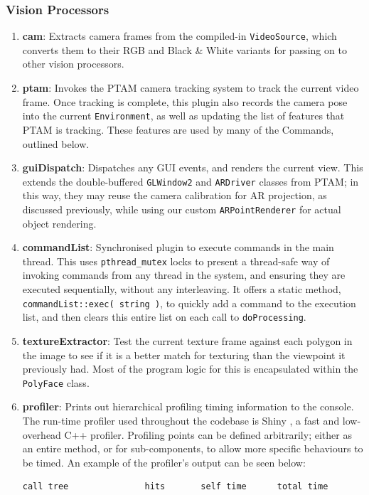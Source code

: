 \documentclass[a4paper,10pt]{article}
\begin{document}
\subsubsection{Vision Processors}
\begin{enumerate}
\item{\textbf{cam}: Extracts camera frames from the compiled-in \texttt{VideoSource}, which converts them to their RGB and Black \& White variants for passing on to other vision processors.}
\item{\textbf{ptam}: Invokes the PTAM camera tracking system to track the current video frame. Once tracking is complete, this plugin also records the camera pose into the current \texttt{Environment}, as well as updating the list of features that PTAM is tracking. These features are used by many of the Commands, outlined below.}
\item{\textbf{guiDispatch}: Dispatches any GUI events, and renders the current view. This extends the double-buffered \texttt{GLWindow2} and \texttt{ARDriver} classes from PTAM; in this way, they may reuse the camera calibration for AR projection, as discussed previously, while using our custom \texttt{ARPointRenderer} for actual object rendering.}
\item{\textbf{commandList}: Synchronised plugin to execute commands in the main thread. This uses \texttt{pthread\_mutex} locks to present a thread-safe way of invoking commands from any thread in the system, and ensuring they are executed sequentially, without any interleaving. It offers a static method, \texttt{commandList::exec( string )}, to quickly add a command to the execution list, and then clears this entire list on each call to \texttt{doProcessing}.}
\item{\textbf{textureExtractor}: Test the current texture frame against each polygon in the image to see if it is a better match for texturing than the viewpoint it previously had. Most of the program logic for this is encapsulated within the \texttt{PolyFace} class.}
\item{\textbf{profiler}: Prints out hierarchical profiling timing information to the console. The run-time profiler used throughout the codebase is Shiny \cite{shiny}, a fast and low-overhead C++ profiler. Profiling points can be defined arbitrarily; either as an entire method, or for sub-components, to allow more specific behaviours to be timed. An example of the profiler's output can be seen below:
\begin{verbatim}
call tree               hits       self time      total time

\end{verbatim}}
\end{enumerate}
\end{document}
